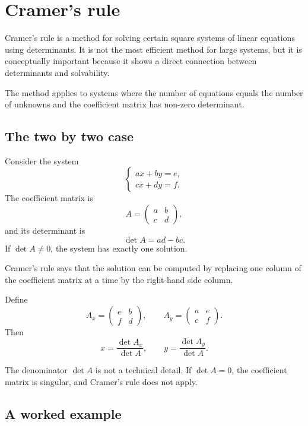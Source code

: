 \section{Cramer's rule}

Cramer's rule is a method for solving certain square systems of linear equations using determinants. It is not the most efficient method for large systems, but it is conceptually important because it shows a direct connection between determinants and solvability.

The method applies to systems where the number of equations equals the number of unknowns and the coefficient matrix has non-zero determinant.

\subsection*{The two by two case}

Consider the system
\[
\begin{cases}
a x+b y=e,\\
c x+d y=f.
\end{cases}
\]
The coefficient matrix is
\[
A=\begin{pmatrix}
a&b\\
c&d
\end{pmatrix},
\]
and its determinant is
\[
\det A=ad-bc.
\]
If \(\det A\ne0\), the system has exactly one solution.

Cramer's rule says that the solution can be computed by replacing one column of the coefficient matrix at a time by the right-hand side column.

Define
\[
A_x=\begin{pmatrix}
e&b\\
f&d
\end{pmatrix},
\qquad
A_y=\begin{pmatrix}
a&e\\
c&f
\end{pmatrix}.
\]
Then
\[
x=\frac{\det A_x}{\det A},
\qquad
 y=\frac{\det A_y}{\det A}.
\]

\begin{remarkbox}
The denominator \(\det A\) is not a technical detail. If \(\det A=0\), the coefficient matrix is singular, and Cramer's rule does not apply.
\end{remarkbox}

\subsection*{A worked example}

